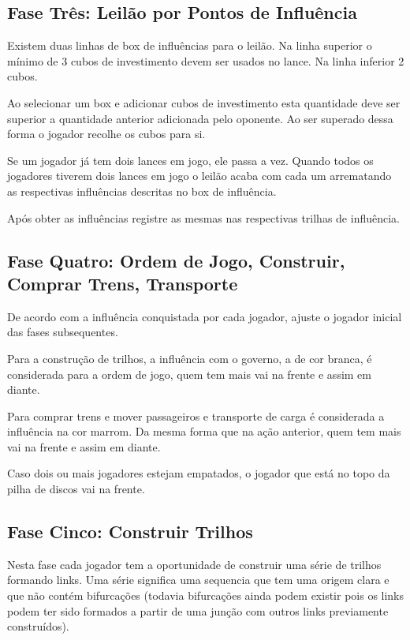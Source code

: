 \documentclass[11pt]{article}
\begin{document}
\subsection{Fase Três: Leilão por Pontos de Influência}
\label{sec:org2b6c98e}

Existem duas linhas de box de influências para o leilão. Na linha superior o mínimo de 3 cubos de investimento devem ser usados no lance. Na linha inferior 2 cubos.

Ao selecionar um box e adicionar cubos de investimento esta quantidade deve ser superior a quantidade anterior adicionada pelo oponente. Ao ser superado dessa forma
o jogador recolhe os cubos para si.

Se um jogador já tem dois lances em jogo, ele passa a vez. Quando todos os jogadores tiverem dois lances em jogo o leilão acaba com cada um arrematando as respectivas influências
descritas no box de influência.

Após obter as influências registre as mesmas nas respectivas trilhas de influência.

\subsection{Fase Quatro: Ordem de Jogo, Construir, Comprar Trens, Transporte}
\label{sec:org65509ae}

De acordo com a influência conquistada por cada jogador, ajuste o jogador inicial das fases subsequentes.

Para a construção de trilhos, a influência com o governo, a de cor branca, é considerada para a ordem de jogo, quem tem mais vai na frente e assim em diante.

Para comprar trens e mover passageiros e transporte de carga é considerada a influência na cor marrom. Da mesma forma que na ação anterior, quem tem mais vai na frente e assim em diante.

Caso dois ou mais jogadores estejam empatados, o jogador que está no topo da pilha de discos vai na frente.

\subsection{Fase Cinco: Construir Trilhos}
\label{sec:org08f46a9}

Nesta fase cada jogador tem a oportunidade de construir uma série de trilhos formando links. Uma série significa uma sequencia que tem uma origem clara e que não contém bifurcações (todavia bifurcações ainda
podem existir pois os links podem ter sido formados a partir de uma junção com outros links previamente construídos).
\end{document}
